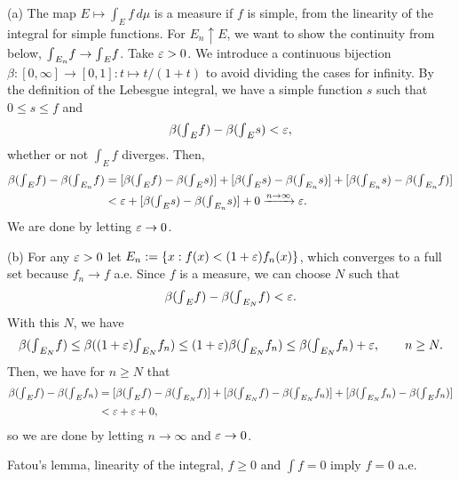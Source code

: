 \documentclass{../../large}
\begin{document}
\begin{pf}
(a)
The map $E\mapsto\int_Ef\,d\mu$ is a measure if $f$ is simple, from the linearity of the integral for simple functions.
For $E_n\uparrow E$, we want to show the continuity from below, ${\textstyle\int}_{E_n}f\to{\textstyle\int}_Ef$.
Take $\varepsilon>0$.
We introduce a continuous bijection $\beta:[0,\infty]\to[0,1]:t\mapsto t/(1+t)$ to avoid dividing the cases for infinity.
By the definition of the Lebesgue integral, we have a simple function $s$ such that $0\le s\le f$ and
\[\beta({\textstyle\int}_Ef)-\beta({\textstyle\int}_Es)<\varepsilon,\]
whether or not $\int_Ef$ diverges.
Then,
\begin{align*}
\beta({\textstyle\int}_Ef)-\beta({\textstyle\int}_{E_n}f)
&=[\beta({\textstyle\int}_Ef)-\beta({\textstyle\int}_Es)]
+[\beta({\textstyle\int}_Es)-\beta({\textstyle\int}_{E_n}s)]
+[\beta({\textstyle\int}_{E_n}s)-\beta({\textstyle\int}_{E_n}f)]\\
&<\varepsilon+[\beta({\textstyle\int}_Es)-\beta({\textstyle\int}_{E_n}s)]+0
\xrightarrow{n\to\infty}\varepsilon.
\end{align*}
We are done by letting $\varepsilon\to0$.

(b)
For any $\varepsilon>0$ let $E_n:=\{x:f(x)<(1+\varepsilon)f_n(x)\}$, which converges to a full set because $f_n\to f$ a.e.
Since $f$ is a measure, we can choose $N$ such that
\[\beta({\textstyle\int}_Ef)-\beta({\textstyle\int}_{E_N}f)<\varepsilon.\]
With this $N$, we have
\[\beta({\textstyle\int}_{E_N}f)
\le\beta((1+\varepsilon){\textstyle\int}_{E_N}f_n)
\le(1+\varepsilon)\beta({\textstyle\int}_{E_N}f_n)
\le\beta({\textstyle\int}_{E_N}f_n)+\varepsilon,\qquad n\ge N.\]
Then, we have for $n\ge N$ that
\begin{align*}
\beta({\textstyle\int}_Ef)-\beta({\textstyle\int}_Ef_n)
&=[\beta({\textstyle\int}_Ef)-\beta({\textstyle\int}_{E_N}f)]+[\beta({\textstyle\int}_{E_N}f)-\beta({\textstyle\int}_{E_N}f_n)]+[\beta({\textstyle\int}_{E_N}f_n)-\beta({\textstyle\int}_{E}f_n)]\\
&<\varepsilon+\varepsilon+0,
\end{align*}
so we are done by letting $n\to\infty$ and $\varepsilon\to0$.
\end{pf}

\begin{prb}
Fatou's lemma, linearity of the integral, $f\ge0$ and $\int f=0$ imply $f=0$ a.e.
\end{prb}
\end{document}
